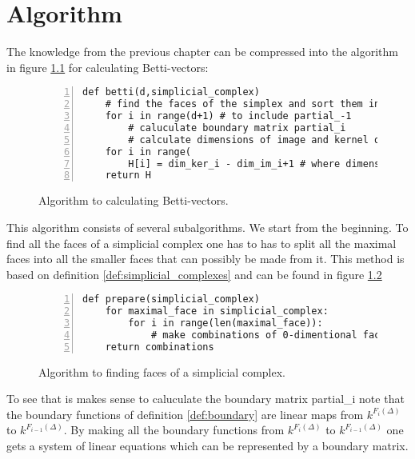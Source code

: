 \documentclass[11pt,a4paper,twoside]{report}
\begin{document}
\chapter{Algorithm}\label{ch:algebra}
The knowledge from the previous chapter can be compressed into the algorithm in figure \ref{fig:Algorithm} for calculating Betti-vectors:
\begin{figure}[H]
\begin{lstlisting}[numbers=left]
def betti(d,simplicial_complex)
    # find the faces of the simplex and sort them into lengths
    for i in range(d+1) # to include partial_-1
        # caluculate boundary matrix partial_i
        # calculate dimensions of image and kernel of partial_i
    for i in range(  
        H[i] = dim_ker_i - dim_im_i+1 # where dimensions are 0 if not calculated
    return H
\end{lstlisting}
\caption{Algorithm to calculating Betti-vectors.}
\label{fig:Algorithm}
\end{figure}
This algorithm consists of several subalgorithms. We start from the beginning. To find all the faces of a simplicial complex one has to has to split all the maximal faces into all the smaller faces that can possibly be made from it. This method is based on definition \ref{def:simplicial_complexes} and can be found in figure \ref{fig:Algorithm_faces}
\begin{figure}[H]
\begin{lstlisting}[numbers=left]
def prepare(simplicial_complex)
    for maximal_face in simplicial_complex:
        for i in range(len(maximal_face)):
            # make combinations of 0-dimentional faces in maximal_face of length i
    return combinations    
\end{lstlisting}
\caption{Algorithm to finding faces of a simplicial complex.}
\label{fig:Algorithm_faces}
\end{figure}
To see that is makes sense to caluculate the boundary matrix partial\_i note that the boundary functions of definition \ref{def:boundary} are linear maps from $k^{F_i(\Delta)}$ to $k^{F_{i-1}(\Delta)}$. By making all the boundary functions from $k^{F_i(\Delta)}$ to $k^{F_{i-1}(\Delta)}$ one gets a system of linear equations which can be represented by a boundary matrix.
\end{document}

